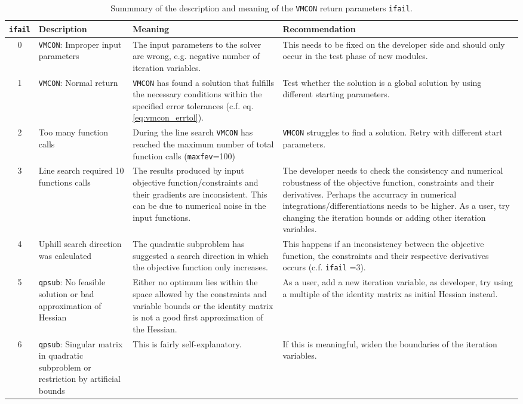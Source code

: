 \documentclass[11pt,a4paper]{report}
\newcommand{\ifail}{\mbox{\texttt{ifail}}}
\newcommand{\vmcon}{\mbox{\texttt{VMCON}}}
\begin{document}
\begin{table}
\footnotesize
\begin{center}
\begin{tabular}{|c|p{2.7cm}|p{3.4cm}|p{3.4cm}|}
  \hline
  \ifail\/ & Description & Meaning & Recommendation \\
  \hline
  \colorbox{red!20}{ 0 }&\vmcon: Improper input parameters & The input
  parameters to the solver are wrong, e.g. negative number of iteration
  variables. & This needs to be fixed on the developer side and should only
  occur in the test phase of new modules. \\
  \hline
  \colorbox{green!20}{ 1 } &\vmcon: Normal return & \vmcon\/ has found a
  solution that fulfills the necessary conditions within the specified error
  tolerances (c.f. eq. \ref{eq:vmcon_errtol}). & Test whether the solution is
  a global solution by using different starting parameters.\\
  \hline
  \colorbox{red!20}{ 2 } & Too many function calls & During the line search
  \vmcon\/ has reached the maximum number of total function calls
  (\texttt{maxfev}=100)  & \vmcon\/ struggles to find a solution. Retry with
  different start parameters. \\
  \hline
  \colorbox{red!20}{ 3 } & Line search required 10 functions calls & The
  results produced by input objective function/constraints and  their
  gradients are inconsistent. This can be due to numerical noise in the input
  functions. & The developer needs to check the consistency and numerical
  robustness of the objective function, constraints and their
  derivatives. Perhaps the accurracy in numerical
  integrations/differentiations needs to be higher. As a user, try changing
  the iteration bounds or adding other iteration variables. \\
  \hline
  \colorbox{red!20}{ 4 } & Uphill search direction was calculated & The
  quadratic subproblem has suggested a search direction in which the objective
  function only increases.  & This happens if an inconsistency between the
  objective function, the constraints and their respective derivatives occurs
  (c.f. \ifail\/ =3).\\
  \hline
  \colorbox{red!20}{ 5 }&\texttt{qpsub}: No feasible solution or bad
  approximation of Hessian & Either no optimum lies within the space allowed
  by the constraints and variable bounds or the identity matrix is not a good
  first approximation of the Hessian. & As a user, add a new iteration
  variable, as developer, try using a multiple of the identity matrix as
  initial Hessian instead.\\
  \hline
  \colorbox{red!20}{ 6 } &\texttt{qpsub}: Singular matrix in quadratic
  subproblem or restriction by artificial bounds & This is fairly
  self-explanatory. & If this is meaningful, widen the boundaries of the
  iteration variables.  \\
  \hline
\end{tabular}
\end{center}
\caption{Summmary of the description and  meaning of the \vmcon\/ return
  parameters \ifail\/. }
\label{tab:ifail}
\normalsize
\end{table}
\end{document}
